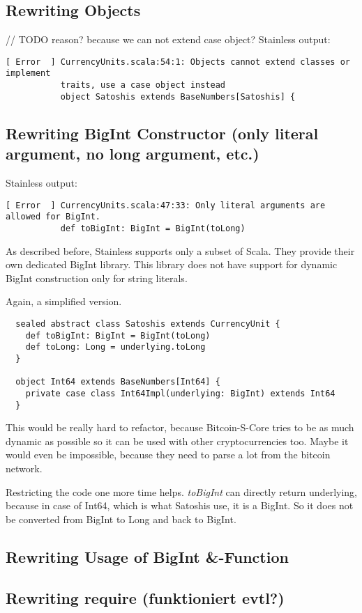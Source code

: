 \subsection{Rewriting Objects}
// TODO reason? because we can not extend case object?
Stainless output:
\begin{lstlisting}
[ Error  ] CurrencyUnits.scala:54:1: Objects cannot extend classes or implement
           traits, use a case object instead
           object Satoshis extends BaseNumbers[Satoshis] {
\end{lstlisting}

\subsection{Rewriting BigInt Constructor (only literal argument, no long argument, etc.)}
Stainless output:
\begin{lstlisting}
[ Error  ] CurrencyUnits.scala:47:33: Only literal arguments are allowed for BigInt.
           def toBigInt: BigInt = BigInt(toLong)
\end{lstlisting}
As described before, Stainless supports only a subset of Scala.
They provide their own dedicated BigInt library.
This library does not have support for dynamic BigInt construction only for string literals.

Again, a simplified version.
\begin{lstlisting}
  sealed abstract class Satoshis extends CurrencyUnit {
    def toBigInt: BigInt = BigInt(toLong)
    def toLong: Long = underlying.toLong
  }

  object Int64 extends BaseNumbers[Int64] {
    private case class Int64Impl(underlying: BigInt) extends Int64
  }
\end{lstlisting}
This would be really hard to refactor, because Bitcoin-S-Core tries to be as much dynamic as possible so it can be used with other cryptocurrencies too.
Maybe it would even be impossible, because they need to parse a lot from the bitcoin network.

Restricting the code one more time helps.
\emph{toBigInt} can directly return underlying, because in case of Int64, which is what Satoshis use, it is a BigInt.
So it does not be converted from BigInt to Long and back to BigInt.

\subsection{Rewriting Usage of BigInt \&-Function}

\subsection{Rewriting require (funktioniert evtl?)}
